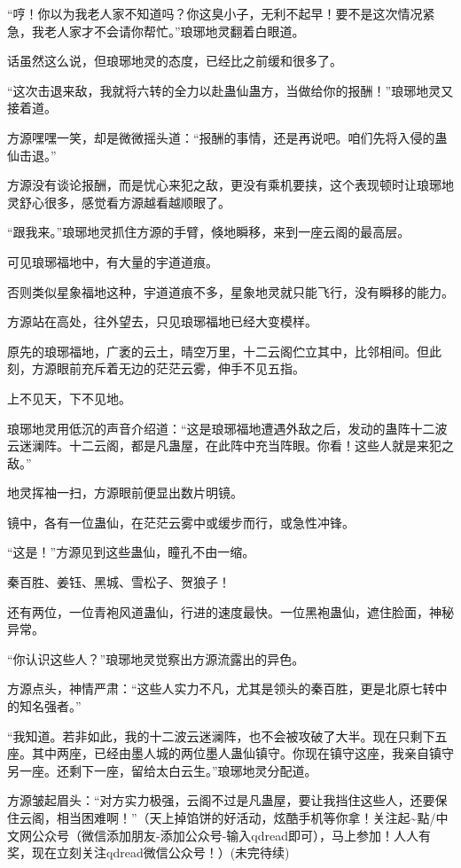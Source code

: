 \begin{this_body}
“哼！你以为我老人家不知道吗？你这臭小子，无利不起早！要不是这次情况紧急，我老人家才不会请你帮忙。”琅琊地灵翻着白眼道。

话虽然这么说，但琅琊地灵的态度，已经比之前缓和很多了。

“这次击退来敌，我就将六转的全力以赴蛊仙蛊方，当做给你的报酬！”琅琊地灵又接着道。

方源嘿嘿一笑，却是微微摇头道：“报酬的事情，还是再说吧。咱们先将入侵的蛊仙击退。”

方源没有谈论报酬，而是忧心来犯之敌，更没有乘机要挟，这个表现顿时让琅琊地灵舒心很多，感觉看方源越看越顺眼了。

“跟我来。”琅琊地灵抓住方源的手臂，倏地瞬移，来到一座云阁的最高层。

可见琅琊福地中，有大量的宇道道痕。

否则类似星象福地这种，宇道道痕不多，星象地灵就只能飞行，没有瞬移的能力。

方源站在高处，往外望去，只见琅琊福地已经大变模样。

原先的琅琊福地，广袤的云土，晴空万里，十二云阁伫立其中，比邻相间。但此刻，方源眼前充斥着无边的茫茫云雾，伸手不见五指。

上不见天，下不见地。

琅琊地灵用低沉的声音介绍道：“这是琅琊福地遭遇外敌之后，发动的蛊阵十二波云迷澜阵。十二云阁，都是凡蛊屋，在此阵中充当阵眼。你看！这些人就是来犯之敌。”

地灵挥袖一扫，方源眼前便显出数片明镜。

镜中，各有一位蛊仙，在茫茫云雾中或缓步而行，或急性冲锋。

“这是！”方源见到这些蛊仙，瞳孔不由一缩。

秦百胜、姜钰、黑城、雪松子、贺狼子！

还有两位，一位青袍风道蛊仙，行进的速度最快。一位黑袍蛊仙，遮住脸面，神秘异常。

“你认识这些人？”琅琊地灵觉察出方源流露出的异色。

方源点头，神情严肃：“这些人实力不凡，尤其是领头的秦百胜，更是北原七转中的知名强者。”

“我知道。若非如此，我的十二波云迷澜阵，也不会被攻破了大半。现在只剩下五座。其中两座，已经由墨人城的两位墨人蛊仙镇守。你现在镇守这座，我亲自镇守另一座。还剩下一座，留给太白云生。”琅琊地灵分配道。

方源皱起眉头：“对方实力极强，云阁不过是凡蛊屋，要让我挡住这些人，还要保住云阁，相当困难啊！”（天上掉馅饼的好活动，炫酷手机等你拿！关注起\~{}點/中文网公众号（微信添加朋友-添加公众号-输入qdread即可），马上参加！人人有奖，现在立刻关注qdread微信公众号！）(未完待续)

\end{this_body}

